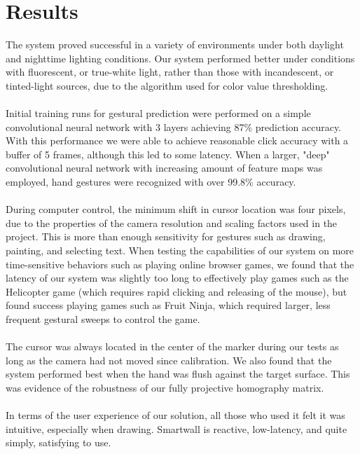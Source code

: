 \documentclass[twoside,twocolumn]{article}
\begin{document}
\section{Results}
The system proved successful in a variety of environments under both daylight and nighttime lighting conditions. Our system performed better under conditions with fluorescent, or true-white light, rather than those with incandescent, or tinted-light sources, due to the algorithm used for color value thresholding. \\ \\Initial training runs for gestural prediction were performed on a simple convolutional neural network with 3 layers achieving 87\% prediction accuracy. With this performance we were able to achieve reasonable click accuracy with a buffer of 5 frames, although this led to some latency. When a larger, "deep" convolutional neural network with increasing amount of feature maps was employed, hand gestures were recognized with over 99.8\% accuracy. \\ \\ During computer control, the minimum shift in cursor location was four pixels, due to the properties of the camera resolution and scaling factors used in the project. This is more than enough sensitivity for gestures such as drawing, painting, and selecting text. When testing the capabilities of our system on more time-sensitive behaviors such as playing online browser games, we found that the latency of our system was slightly too long to effectively play games such as the Helicopter game (which requires rapid clicking and releasing of the mouse), but found success playing games such as Fruit Ninja, which required larger, less frequent gestural sweeps to control the game.\\ \\
The cursor was always located in the center of the marker during our tests as long as the camera had not moved since calibration. We also found that the system performed best when the hand was flush against the target surface. This was evidence of the robustness of our fully projective homography matrix.\\ \\
In terms of the user experience of our solution, all those who used it felt it was intuitive, especially when drawing. Smartwall is reactive, low-latency, and quite simply, satisfying to use.

\end{document}
